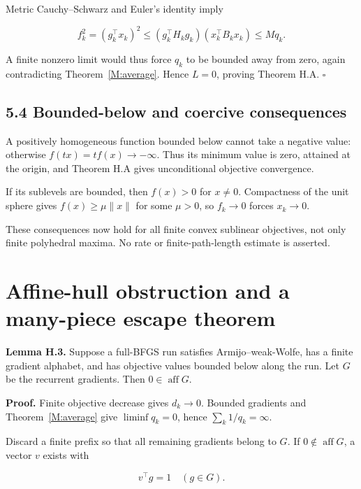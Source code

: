 Metric Cauchy--Schwarz and Euler's identity imply

\[
f_k^2=(g_k^\top x_k)^2
\le(g_k^\top H_kg_k)(x_k^\top B_kx_k)
\le Mq_k.
\]

A finite nonzero limit would thus force \(q_k\) to be bounded away from
zero, again contradicting Theorem~\ref{M:average}. Hence \(L=0\), proving Theorem H.A.
\(\square\)

\subsection{5.4 Bounded-below and coercive
consequences}\label{H:bounded-below-and-coercive-consequences}

A positively homogeneous function bounded below cannot take a negative
value: otherwise \(f(tx)=tf(x)\to-\infty\). Thus its minimum value is
zero, attained at the origin, and Theorem H.A gives unconditional
objective convergence.

If its sublevels are bounded, then \(f(x)>0\) for \(x\ne0\). Compactness
of the unit sphere gives \(f(x)\ge\mu\|x\|\) for some \(\mu>0\), so
\(f_k\to0\) forces \(x_k\to0\).

These consequences now hold for all finite convex sublinear objectives,
not only finite polyhedral maxima. No rate or finite-path-length
estimate is asserted.


\setcounter{section}{5}
\setcounter{theorem}{0}
\setcounter{lemma}{0}
\setcounter{corollary}{0}
\setcounter{proposition}{0}
\setcounter{remark}{0}
\setcounter{equation}{0}
\section{Affine-hull obstruction and a many-piece escape
theorem}\label{H:affine-hull-obstruction-and-a-many-piece-escape-theorem}

\textbf{Lemma H.3.} Suppose a full-BFGS run satisfies Armijo--weak-Wolfe,
has a finite gradient alphabet, and has objective values bounded below
along the run. Let \(G\) be the recurrent gradients. Then
\(0\in\operatorname{aff}G\).

\textbf{Proof.} Finite objective decrease gives \(d_k\to0\). Bounded
gradients and Theorem~\ref{M:average} give \(\liminf q_k=0\), hence
\(\sum_k1/q_k=\infty\).

Discard a finite prefix so that all remaining gradients belong to \(G\).
If \(0\notin\operatorname{aff}G\), a vector \(v\) exists with

\[
v^\top g=1\quad(g\in G).
\]

